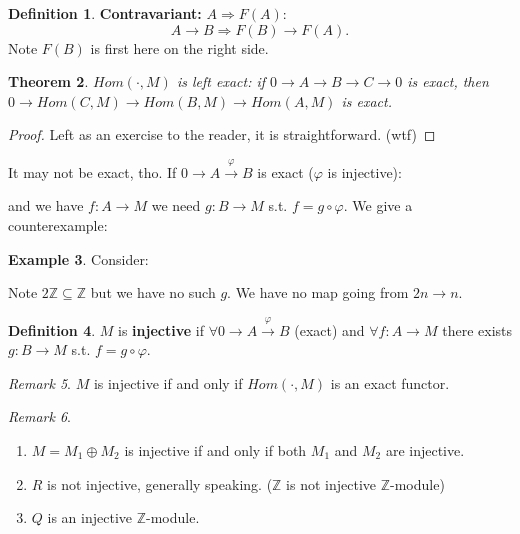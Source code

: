 \documentclass[9pt,reqno,twoside]{amsbook}
\theoremstyle{plain}
\newtheorem{theorem}{Theorem}[chapter]
\numberwithin{section}{chapter}
\numberwithin{equation}{chapter}
\theoremstyle{definition}
\newtheorem{Def}[theorem]{Definition}
\newtheorem{Ex}[theorem]{Example}
\theoremstyle{remark}
\newtheorem{rem}[theorem]{Remark}
\theoremstyle{plain}
\newcommand{\sub}{\subseteq}
\newcommand{\z}{\mathbb{Z}}
\renewcommand{\phi}{\varphi}
\begin{document}
\begin{Def}
\textbf{Contravariant: } $A \Rightarrow F(A)$:
$$
A \to B \Rightarrow F(B) \to F(A).
$$
Note $F(B)$ is first here on the right side. 
\end{Def}

\begin{theorem}
$Hom(\cdot,M)$ is left exact: 
if $0 \to A \to B \to C \to 0$ is exact, then
$0 \to Hom(C,M) \to Hom(B,M) \to Hom(A,M)$ is exact. 
\end{theorem}

\begin{proof}
Left as an exercise to the reader, it is straightforward. (wtf)
\end{proof}

It may not be exact, tho. If $0 \to A \overset{\phi}{\to}B$ is exact ($\phi$ is injective):
\begin{center}
\end{center}
and we have $f: A \to M$ we need $g:B \to M$ s.t. $f = g \circ \phi$. 
We give a counterexample:
\begin{Ex}
Consider: 
\begin{center}
\end{center}
Note $2\z \sub \z$ but we have no such $g$. We have no map going from $2n \to n$. 
\end{Ex}

\begin{Def}
$M$ is \textbf{injective} if $\forall 0 \to A \overset{\phi}{\to} B$ (exact) and $\forall f: A \to M$ there exists $g: B \to M$ s.t. $f = g \circ \phi$. 
\end{Def}

\begin{rem}
$M$ is injective if and only if $Hom(\cdot,M)$ is an exact functor. 
\end{rem}

\begin{rem}
\begin{enumerate}
\item $M = M_1 \oplus M_2$ is injective if and only if both $M_1$ and $M_2$ are injective. 
\item $R$ is not injective, generally speaking. ($\z$ is not injective $\z$-module)
\item $Q$ is an injective $\z$-module. 
\end{enumerate}
\end{rem}
\end{document}
